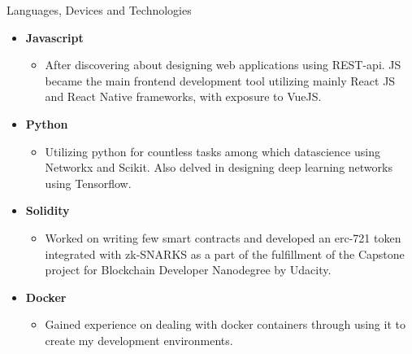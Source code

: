 \documentclass[]{mcdowellcv}
\begin{document}
	\begin{cvsection}{Languages, Devices and Technologies}
		\begin{cvsubsection}{}{}{}	
			\begin{itemize}
				\item \textbf{Javascript} 
				\begin{itemize}
					\item After discovering about designing web applications using REST-api. JS became the main frontend development tool utilizing mainly React JS and React Native frameworks, with exposure to VueJS.
				\end{itemize}
				\item \textbf{Python}
				\begin{itemize}
					\item Utilizing python for countless tasks among which datascience using Networkx and Scikit. Also delved in designing deep learning networks using Tensorflow. 
				\end{itemize}
				
				\item \textbf{Solidity}
				\begin{itemize}
					\item Worked on writing few smart contracts and developed an erc-721 token integrated with zk-SNARKS as a part of the fulfillment of the Capstone project for Blockchain Developer Nanodegree by Udacity.
				\end{itemize}
				\item \textbf{Docker}
				\begin{itemize}
					\item Gained experience on dealing with docker containers through using it to create my development environments. 
				\end{itemize}
				
				
				\newpage
				

\end{itemize}
\end{cvsubsection}
\end{cvsection}
\end{document}
